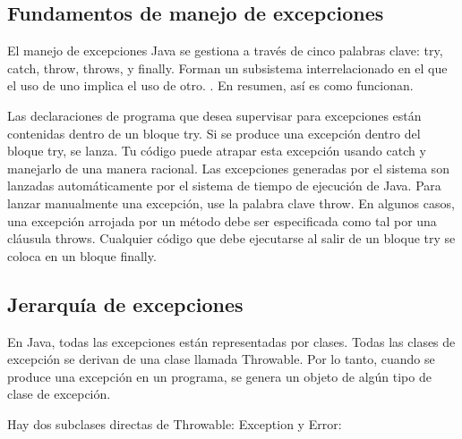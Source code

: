 \documentclass[12pt,a4paper]{report}
\begin{document}
{\subsection*{Fundamentos de manejo de excepciones}
El manejo de excepciones Java se gestiona a través de cinco palabras clave: try, catch, throw, throws,
y finally. Forman un subsistema interrelacionado en el que el uso de uno implica el uso de otro. . En resumen, así es como funcionan.

Las declaraciones de programa que desea supervisar para excepciones están contenidas dentro de un bloque try. Si se produce una excepción dentro del bloque try, se lanza. Tu código puede atrapar esta excepción usando catch y manejarlo de una manera racional. Las excepciones generadas por el sistema son lanzadas automáticamente por el sistema de tiempo de ejecución de Java. Para lanzar manualmente una excepción, use la palabra clave throw. En algunos casos, una excepción arrojada por un método debe ser especificada como tal por una cláusula throws. Cualquier código que debe ejecutarse al salir de un bloque try se coloca en un bloque finally.

\subsection*{Jerarquía de excepciones}
En Java, todas las excepciones están representadas por clases. Todas las clases de excepción se derivan de una clase llamada Throwable. Por lo tanto, cuando se produce una excepción en un programa, se genera un objeto de algún tipo de clase de excepción.

Hay dos subclases directas de Throwable: Exception y Error:

}
\end{document}
